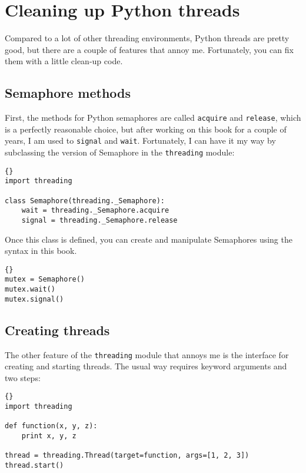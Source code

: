 \chapter{Cleaning up Python threads}
\label{cleanup}

Compared to a lot of other threading environments, Python threads are
pretty good, but there are a couple of features that annoy me.
Fortunately, you can fix them with a little clean-up code.

\section{Semaphore methods}

First, the methods for Python semaphores are called {\tt acquire}
and {\tt release}, which is a perfectly reasonable choice, but
after working on this book for a couple of years, I am used
to {\tt signal} and {\tt wait}.  Fortunately, I can have it
my way by subclassing the version of Semaphore in the
{\tt threading} module:

\begin{lstlisting}[title={Semaphore name change}]{}
import threading
 
class Semaphore(threading._Semaphore):
    wait = threading._Semaphore.acquire
    signal = threading._Semaphore.release
\end{lstlisting}

Once this class is defined, you can create and manipulate Semaphores
using the syntax in this book.

\begin{lstlisting}[title={Semaphore example}]{}
mutex = Semaphore()
mutex.wait()
mutex.signal()
\end{lstlisting}

\section{Creating threads}

The other feature of the {\tt threading} module that annoys
me is the interface for creating and starting threads.  The
usual way requires keyword arguments and two steps:

\begin{lstlisting}[title={Thread example (standard way)}]{}
import threading

def function(x, y, z):
    print x, y, z

thread = threading.Thread(target=function, args=[1, 2, 3])
thread.start()
\end{lstlisting}

